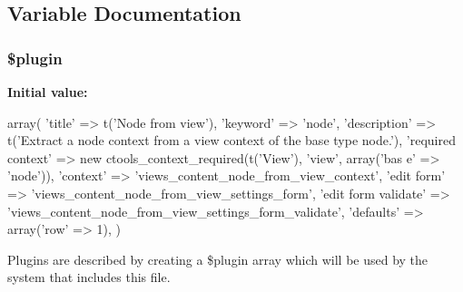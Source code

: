 \subsection{Variable Documentation}
\hypertarget{node__from__view_8inc_ada8a7130088351710bb02ed622d6bf65}{
\subsubsection[{\$plugin}]{\setlength{\rightskip}{0pt plus 5cm}\$plugin}}
\label{node__from__view_8inc_ada8a7130088351710bb02ed622d6bf65}
{\bfseries Initial value:}
\begin{DoxyCode}
 array(
  'title' => t('Node from view'),
  'keyword' => 'node',
  'description' => t('Extract a node context from a view context of the base type
       node.'),
  'required context' => new ctools_context_required(t('View'), 'view', array('bas
      e' => 'node')),
  'context' => 'views_content_node_from_view_context',
  'edit form' => 'views_content_node_from_view_settings_form',
  'edit form validate' => 'views_content_node_from_view_settings_form_validate',
  'defaults' => array('row' => 1),
)
\end{DoxyCode}
Plugins are described by creating a \$plugin array which will be used by the system that includes this file. 